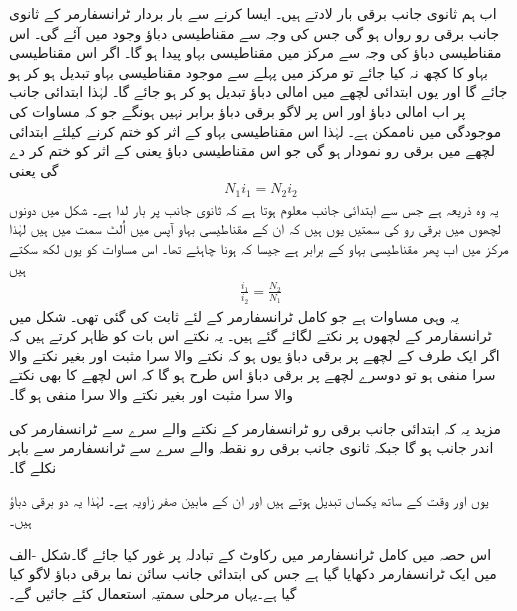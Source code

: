 اب ہم ثانوی جانب  برقی بار لادتے ہیں۔ ایسا کرنے سے بار بردار ٹرانسفارمر  کے  ثانوی جانب  برقی رو  رواں ہو گی جس کی وجہ سے  مقناطیسی دباؤ وجود میں آئے گی۔ اس مقناطیسی دباؤ کی وجہ سے مرکز میں مقناطیسی بہاو   پیدا ہو گا۔ اگر اس مقناطیسی بہاو کا کچھ  نہ کیا جائے تو مرکز میں پہلے سے موجود مقناطیسی بہاو تبدیل ہو کر  ہو جائے گا اور یوں ابتدائی لچھے میں امالی دباؤ تبدیل ہو کر  ہو جائے گا۔  لہٰذا ابتدائی جانب پر اب امالی دباؤ اور اس پر لاگو برقی دباؤ برابر نہیں ہونگے جو کہ مساوات   کی موجودگی میں ناممکن ہے۔ لہٰذا اس مقناطیسی بہاو   کے اثر کو ختم کرنے کیلئے ابتدائی لچھے میں برقی رو  نمودار ہو گی جو اس مقناطیسی دباؤ یعنی  کے اثر کو ختم کر دے گی یعنی
\begin{align}
N_1 i_1=N_2 i_2
\end{align}
یہ وہ ذریعہ ہے جس سے ابتدائی جانب معلوم ہوتا ہے کہ ثانوی جانب پر بار لدا ہے۔ شکل میں دونوں لچھوں میں برقی رو کی سمتیں یوں ہیں کہ ان کے مقناطیسی بہاو آپس میں اُلٹ سمت میں ہیں لہٰذا  مرکز میں اب پھر مقناطیسی بہاو   کے برابر  ہے جیسا کہ ہونا چاہئے تھا۔ اس مساوات کو یوں لکھ سکتے ہیں
\begin{align}\label{مساوات_ٹرانسفارمر_برقی_رو_اور_چکر_شرح}
\frac{i_1}{i_2}=\frac{N_2}{N_1}
\end{align}
یہ وہی مساوات ہے جو کامل ٹرانسفارمر کے لئے ثابت کی گئی تھی۔
%
	شکل   میں ٹرانسفارمر کے لچھوں پر نکتے لگائے گئے ہیں۔ یہ نکتے اس بات کو ظاہر کرتے ہیں کہ اگر ایک طرف کے لچھے پر برقی دباؤ  یوں ہو کہ نکتے والا سرا مثبت اور بغیر نکتے والا سرا منفی ہو تو دوسرے لچھے  پر برقی دباؤ  اس طرح ہو گا کہ اس لچھے کا بھی  نکتے والا سرا مثبت اور بغیر نکتے والا سرا منفی ہو گا۔

مزید یہ کہ ابتدائی جانب برقی رو ٹرانسفارمر کے نکتے والے سرے سے ٹرانسفارمر کی اندر جانب ہو گا جبکہ ثانوی جانب برقی رو نقطہ والے سرے سے ٹرانسفارمر سے باہر نکلے گا۔

 یوں   اور  وقت کے ساتھ یکساں تبدیل ہوتے ہیں اور ان کے مابین صفر زاویہ ہے۔ لہٰذا یہ دو برقی دباؤ  ہیں۔

اس حصہ میں کامل ٹرانسفارمر میں رکاوٹ کے تبادلہ پر غور کیا جائے گا۔شکل -الف میں ایک ٹرانسفارمر دکھایا گیا ہے جس کی ابتدائی جانب سائن نما برقی دباؤ    لاگو کیا گیا ہے۔یہاں مرحلی سمتیہ استعمال کئے جائیں گے۔

